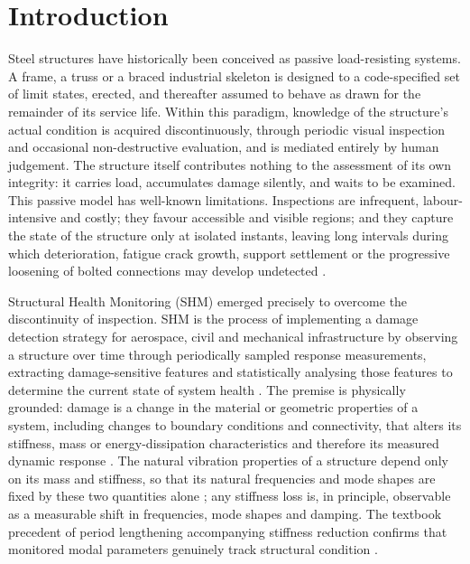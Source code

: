 \section{Introduction}\label{sec:intro}

Steel structures have historically been conceived as passive load-resisting systems. A frame, a truss or a braced industrial skeleton is designed to a code-specified set of limit states, erected, and thereafter assumed to behave as drawn for the remainder of its service life. Within this paradigm, knowledge of the structure's actual condition is acquired discontinuously, through periodic visual inspection and occasional non-destructive evaluation, and is mediated entirely by human judgement. The structure itself contributes nothing to the assessment of its own integrity: it carries load, accumulates damage silently, and waits to be examined. This passive model has well-known limitations. Inspections are infrequent, labour-intensive and costly; they favour accessible and visible regions; and they capture the state of the structure only at isolated instants, leaving long intervals during which deterioration, fatigue crack growth, support settlement or the progressive loosening of bolted connections may develop undetected \citep{avci2021review}.

Structural Health Monitoring (SHM) emerged precisely to overcome the discontinuity of inspection. SHM is the process of implementing a damage detection strategy for aerospace, civil and mechanical infrastructure by observing a structure over time through periodically sampled response measurements, extracting damage-sensitive features and statistically analysing those features to determine the current state of system health \citep{farrar2013shm,farrar2007introduction}. The premise is physically grounded: damage is a change in the material or geometric properties of a system, including changes to boundary conditions and connectivity, that alters its stiffness, mass or energy-dissipation characteristics and therefore its measured dynamic response \citep{farrar2013shm}. The natural vibration properties of a structure depend only on its mass and stiffness, so that its natural frequencies and mode shapes are fixed by these two quantities alone \citep{chopra2017dynamics}; any stiffness loss is, in principle, observable as a measurable shift in frequencies, mode shapes and damping. The textbook precedent of period lengthening accompanying stiffness reduction confirms that monitored modal parameters genuinely track structural condition \citep{chopra2017dynamics}.

